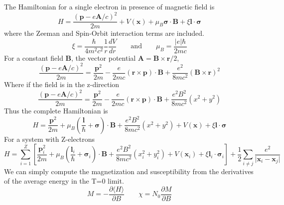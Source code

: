 \documentclass[aps,prb,onecolumn,notitlepage,showpacs,floatfix,superscriptaddress]{revtex4-1}
\begin{document}
The Hamiltonian for a single electron in presence of magnetic field is
\begin{equation}
H=\dfrac{({\bm p}-e {\bm A}/c)^2}{2m} + V({\bm x}) + \mu_B {\bm \sigma}\cdot {\bm B} + \xi {\bm l}\cdot{\bm \sigma}
\end{equation}
where the Zeeman and Spin-Orbit interaction terms are included.
\begin{equation}
\xi = \dfrac{\hbar}{4 m^2 c^2} \dfrac{1}{r}\dfrac{dV}{dr} \qquad \text{and} \qquad \mu_B = \dfrac{\vert e \vert \hbar}{2 m c}
\end{equation}
For a constant field ${\bm B}$, the vector potential ${\bm A} = {\bm B} \times {\bm r}/2$,
\begin{equation}
\dfrac{({\bm p}-e {\bm A}/c)^2}{2m} = \dfrac{{\bm p}^2}{2m} - \dfrac{e}{2mc}({\bm r} \times {\bm p})\cdot {\bm B} + \dfrac{e^2}{8 m c^2} ({\bm B} \times {\bm r})^2
\end{equation}
Where if the field is in the z-direction
\begin{equation}
\dfrac{({\bm p}-e {\bm A}/c)^2}{2m} = \dfrac{{\bm p}^2}{2m} - \dfrac{e}{2mc}({\bm r} \times {\bm p})\cdot {\bm B} + \dfrac{e^2 B^2}{8 m c^2}  (x^2+y^2)
\end{equation}
Thus the complete Hamiltonian is
\begin{equation}
H= \dfrac{{\bm p}^2}{2m} + \mu_B \left(\dfrac{{\bm l}}{\hbar}+{\bm \sigma} \right)\cdot {\bm B} + \dfrac{e^2 B^2}{8 m c^2}  (x^2+y^2)+ V({\bm x}) + \xi {\bm l}\cdot{\bm \sigma}
\end{equation}
For a system with Z-electrons
\begin{equation}
H= \sum_{i=1}^Z \left[ \dfrac{{\bm p}_i ^2}{2m} + \mu_B \left(\dfrac{{\bm l}_i}{\hbar}+{\bm \sigma}_i \right)\cdot {\bm B} + \dfrac{e^2 B^2}{8 m c^2}  (x_i^2+y_i^2)+ V({\bm x}_i) + \xi {\bm l}_i \cdot{\bm \sigma}_i \right] + \dfrac{1}{2}\sum_{i \neq j}\dfrac{e^2}{\vert {\bm x}_i - {\bm x}_j \vert}
\end{equation}
We can simply compute the magnetization and susceptibility from the derivatives of the average energy in the T=0 limit.
\begin{equation}
M=-\dfrac{\partial \langle H \rangle}{\partial B} \qquad \chi = N_0 \dfrac{\partial M}{\partial B}
\end{equation}
\end{document}
